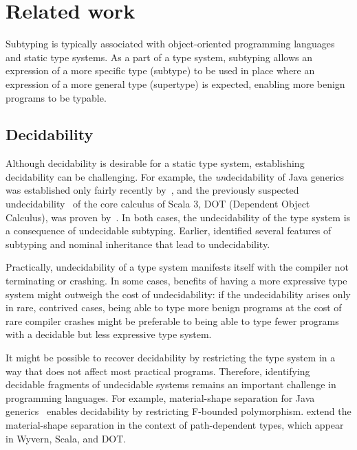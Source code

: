 \chapter{Related work}\label{chap:5}

Subtyping is typically associated with object-oriented programming languages and
static type systems. As a part of a type system, subtyping allows
an expression of a more specific type (subtype) to be used in place
where an expression of a more general type (supertype) is expected,
enabling more benign programs to be typable.

\section{Decidability}

Although decidability is desirable for a static type system, establishing
decidability can be challenging.
For example, the \emph{un}decidability of Java generics was 
established only fairly recently by~\citet{grigore:java-undec:2017},
and the previously suspected undecidability~\cite{amin:dot:2016}
of the core calculus of Scala 3, DOT (Dependent Object Calculus),
was proven by~\citet{hu:dot-undec:2020}. In both cases, the undecidability
of the type system is a consequence of undecidable subtyping. Earlier,
\citet{kennedy:nom-sub-var-dec:2007} identified several features of subtyping
and nominal inheritance that lead to undecidability.

Practically, undecidability of a type system manifests itself with
the compiler not terminating or crashing. In some cases,
benefits of having a more expressive type system might outweigh the cost of
undecidability: if the undecidability arises only in rare, contrived cases,
being able to type more benign programs at the cost of rare compiler crashes
might be preferable to being able to type fewer programs
with a decidable but less expressive type system.

It might be possible to recover decidability by restricting the type system in a
way that does not affect most practical programs. Therefore, identifying
decidable fragments of undecidable systems remains an important challenge in
programming languages. For example, material-shape separation for Java
generics~\cite{greenman:f-bound-material-shape:2014} enables decidability
by restricting F-bounded polymorphism. \citet{mackay:path-dep-dec:2020} extend 
the material-shape separation in the context of path-dependent types, which
appear in Wyvern, Scala, and DOT.

